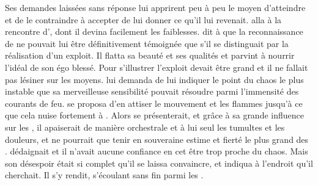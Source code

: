  
  Ses demandes laissées sans réponse lui apprirent peu à peu le moyen d'atteindre \Mey et de le contraindre à accepter de lui donner ce qu'il lui revenait. \Ogo alla à la rencontre d'\Esu, dont il devina facilement les faiblesses. \Ogo dit à \Esu que la reconnaissance de \Mey ne pouvait lui être définitivement témoignée que s'il se distinguait par la réalisation d'un exploit. Il flatta sa beauté et ses qualités et parvint à nourrir l'idéal de son égo blessé. Pour s'illustrer l'exploit devait être grand et il ne fallait pas lésiner sur les moyens. \Ogo lui demanda de lui indiquer le point du chaos le plus instable que sa merveilleuse sensibilité pouvait résoudre parmi l'immensité des courants de feu. \Ogo se proposa d'en attiser le mouvement et les flammes jusqu'à ce que cela nuise fortement à \Mey. Alors \Esu se présenterait, et grâce à sa grande influence sur les \SC, il apaiserait de manière orchestrale et à lui seul les tumultes et les douleurs, et \Mey ne pourrait que tenir en souveraine estime et fierté le plus grand des \Dormus. \Esu dédaignait \Ogo et il n'avait aucune confiance en cet être trop proche du chaos. Mais son désespoir était si complet qu'il se laissa convaincre, et indiqua à \Ogo l'endroit qu'il cherchait. Il s'y rendit, s'écoulant sans fin parmi les \SC. 
